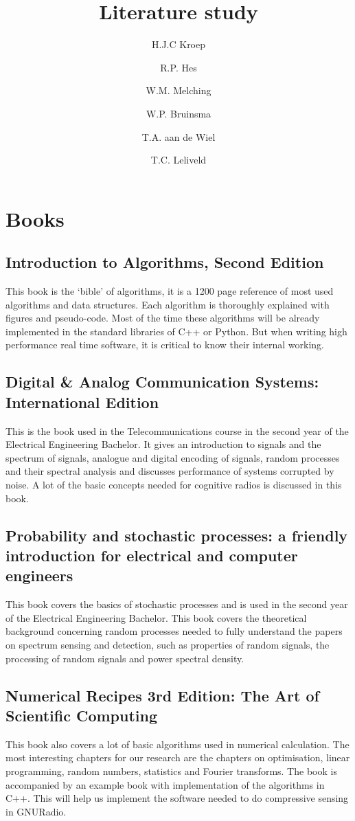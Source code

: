 \documentclass[report, oneside, a4paper, openany]{memoir}
\title{Literature study}
\author{H.J.C Kroep \and R.P. Hes \and W.M. Melching \and W.P. Bruinsma \and T.A. aan de Wiel \and T.C. Leliveld}
\begin{document}
\chapter{Books}
\section{Introduction to Algorithms, Second Edition \cite{cormen2001introduction}}
This book is the `bible' of algorithms, it is a 1200 page reference of most used algorithms and data structures. Each algorithm is thoroughly explained with figures and pseudo-code. Most of the time these algorithms will be already implemented in the standard libraries of C++ or Python. But when writing high performance real time software, it is critical to know their internal working.
\section{Digital \& Analog Communication Systems: International Edition \cite{couch2013digital}}
This is the book used in the Telecommunications course in the second year of the Electrical Engineering Bachelor. It gives an introduction to signals and the spectrum of signals, analogue and digital encoding of signals, random processes and their spectral analysis and discusses performance of systems corrupted by noise. A lot of the basic concepts needed for cognitive radios is discussed in this book. 
\section{Probability and stochastic processes: a friendly introduction for electrical and computer engineers \cite{yates2005probability}}
This book covers the basics of stochastic processes and is used in the second year of the Electrical Engineering Bachelor. This book covers the theoretical background concerning random processes needed to fully understand the papers on spectrum sensing and detection, such as properties of random signals, the processing of random signals and power spectral density.
\section{Numerical Recipes 3rd Edition: The Art of Scientific Computing \cite{press2007numerical}}
This book also covers a lot of basic algorithms used in numerical calculation. The most interesting chapters for our research are the chapters on optimisation, linear programming, random numbers, statistics and Fourier transforms.  The book is accompanied by an example book with implementation of the algorithms in C++. This will help us implement the software needed to do compressive sensing in GNURadio.
\end{document}
